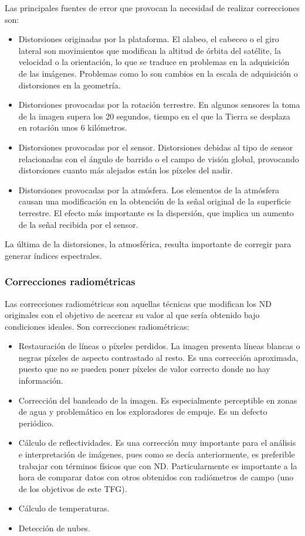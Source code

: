 Las principales fuentes de error que provocan la necesidad de realizar correcciones son:
\begin{itemize}
	\item Distorsiones originadas por la plataforma. El alabeo, el cabeceo o el giro lateral son movimientos que modifican la altitud de órbita del satélite, la velocidad o la orientación, lo que se traduce en problemas en la adquisición de las imágenes. Problemas como lo son cambios en la escala de adquisición o distorsiones en la geometría.
	\item Distorsiones provocadas por la rotación terrestre. En algunos sensores la toma de la imagen supera los 20 segundos, tiempo en el que la Tierra se desplaza en rotación unos 6 kilómetros.
	\item Distorsiones provocadas por el sensor. Distorsiones debidas al tipo de sensor relacionadas con el ángulo de barrido o el campo de visión global, provocando distorsiones cuanto más alejados están los píxeles del nadir.
	\item Distorsiones provocadas por la atmósfera. Los elementos de la atmósfera causan una modificación en la obtención de la señal original de la superficie terrestre. El efecto más importante es la dispersión, que implica un aumento de la señal recibida por el sensor.
\end{itemize}

La última de la distorsiones, la atmosférica, resulta importante de corregir para generar índices espectrales.\Sep

\subsubsection{Correcciones radiométricas}
Las correcciones radiométricas son aquellas técnicas que modifican los \ac{ND} originales con el objetivo de acercar su valor al que sería obtenido bajo condiciones ideales. Son correcciones radiométricas:
\begin{itemize}
	\item Restauración de líneas o píxeles perdidos. La imagen presenta líneas blancas o negras píxeles de aspecto contrastado al resto. Es una corrección aproximada, puesto que no se pueden poner píxeles de valor correcto donde no hay información.
	\item Corrección del bandeado de la imagen. Es especialmente perceptible en zonas de agua y problemático en los exploradores de empuje. Es un defecto periódico.
	\item Cálculo de reflectividades. Es una corrección muy importante para el análisis e interpretación de imágenes, pues como se decía anteriormente, es preferible trabajar con términos físicos que con \ac{ND}. Particularmente es importante a la hora de comparar datos con otros obtenidos con radiómetros de campo (uno de los objetivos de este \ac{TFG}).
	\item Cálculo de temperaturas.
	\item Detección de nubes.
\end{itemize}

